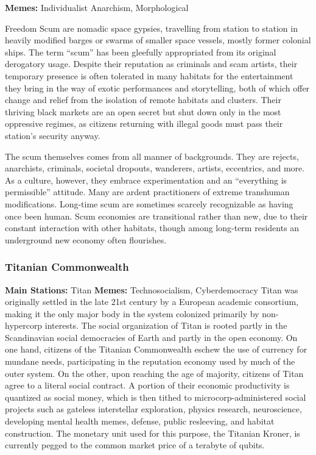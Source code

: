 \textbf{Memes:} Individualist Anarchism, Morphological 

Freedom
Scum are nomadic space gypsies, travelling from station to station in heavily modified barges or swarms 
of smaller space vessels, mostly former colonial ships. 
The term ``scum'' has been gleefully appropriated from 
its original derogatory usage. Despite their reputation 
as criminals and scam artists, their temporary presence 
is often tolerated in many habitats for the entertainment they bring in the way of exotic performances 
and storytelling, both of which offer change and relief 
from the isolation of remote habitats and clusters. 
Their thriving black markets are an open secret but 
shut down only in the most oppressive regimes, as 
citizens returning with illegal goods must pass their 
station's security anyway.

The scum themselves comes from all manner of 
backgrounds. They are rejects, anarchists, criminals, 
societal dropouts, wanderers, artists, eccentrics, 
and more. As a culture, however, they embrace experimentation and an ``everything is permissible'' 
attitude. Many are ardent practitioners of extreme 
transhuman modifications. Long-time scum are 
sometimes scarcely recognizable as having once been 
human. Scum economies are transitional rather than 
new, due to their constant interaction with other 
habitats, though among long-term residents an underground new economy often flourishes.

\subsubsection{Titanian Commonwealth}

\textbf{Main Stations:} Titan
\textbf{Memes:} Technosocialism, Cyberdemocracy
Titan was originally settled in the late 21st century 
by a European academic consortium, making it the 
only major body in the system colonized primarily by non-hypercorp interests. The social organization of Titan is rooted partly in the Scandinavian 
social democracies of Earth and partly in the open 
economy. On one hand, citizens of the Titanian Commonwealth eschew the use of currency for mundane 
needs, participating in the reputation economy used 
by much of the outer system. On the other, upon 
reaching the age of majority, citizens of Titan agree 
to a literal social contract. A portion of their economic productivity is quantized as social money, 
which is then tithed to microcorp-administered social 
projects such as gateless interstellar exploration, 
physics research, neuroscience, developing mental 
health memes, defense, public resleeving, and habitat 
construction. The monetary unit used for this purpose, the Titanian Kroner, is currently pegged to the 
common market price of a terabyte of qubits.

